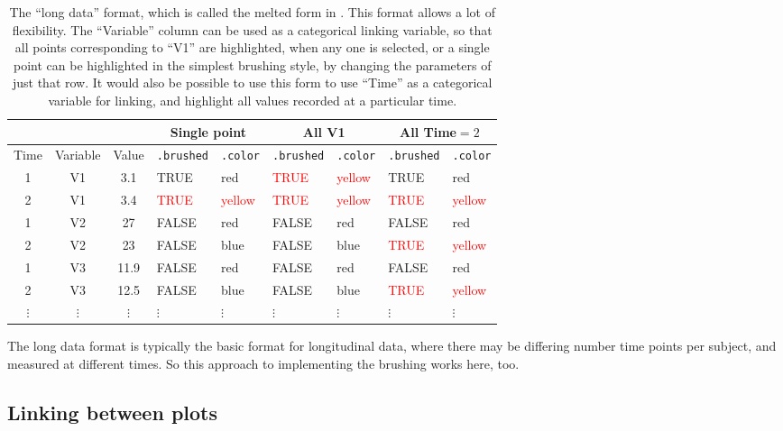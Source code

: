 \documentclass[12pt]{article}
\providecommand{\tabularnewline}{\\}
\begin{document}
\begin{center}
\begin{table}[H]
\begin{centering}
\begin{tabular}{|c|cc|ll||ll||ll|}
\hline 
\multicolumn{1}{|c}{} & \multicolumn{2}{c|}{} & \multicolumn{2}{c||}{Single point}& \multicolumn{2}{c||}{All V1}& \multicolumn{2}{c|}{All Time$=2$}\tabularnewline
\hline 
Time & Variable & Value & \texttt{.brushed} & \texttt{.color} & \texttt{.brushed} & \texttt{.color} & \texttt{.brushed} & \texttt{.color}\tabularnewline
\hline 
1 & V1 & 3.1 & TRUE & red & \textcolor{red}{TRUE} & \textcolor{red}{yellow} & TRUE & red \tabularnewline
2 & V1 & 3.4 & \textcolor{red}{TRUE} & \textcolor{red}{yellow} & \textcolor{red}{TRUE} & \textcolor{red}{yellow} & \textcolor{red}{TRUE} & \textcolor{red}{yellow}\tabularnewline
1 & V2 & 27 & FALSE & red & FALSE & red & FALSE & red\tabularnewline
2 & V2 & 23 & FALSE & blue & FALSE & blue & \textcolor{red}{TRUE} & \textcolor{red}{yellow} \tabularnewline
1 & V3 & 11.9 & FALSE & red & FALSE & red & FALSE & red \tabularnewline
2 & V3 & 12.5 & FALSE & blue & FALSE & blue & \textcolor{red}{TRUE} & \textcolor{red}{yellow}\tabularnewline
$\vdots$ & $\vdots$ & $\vdots$ & $\vdots$ & $\vdots$ & $\vdots$ & $\vdots$ & $\vdots$ & $\vdots$ \tabularnewline
\hline 
\end{tabular}
\par\end{centering}
\caption{\label{tab:long-data}The ``long data'' format, which is called the melted form in \citet{reshape}. This format allows a lot of flexibility. The ``Variable'' column can be used as a categorical linking variable, so that all points corresponding to ``V1'' are highlighted, when any one is selected, or a single point can be highlighted in the simplest brushing style, by changing the parameters of just that row. It would also be possible to use this form to use ``Time'' as a categorical variable for linking, and highlight all values recorded at a particular time. }
\end{table}
\par\end{center}

The long data format is typically the basic format
for longitudinal data, where there may be differing
number time points per subject, and measured at
different times. So this approach to implementing
the brushing works here, too.


\subsection{Linking between plots}
\end{document}
